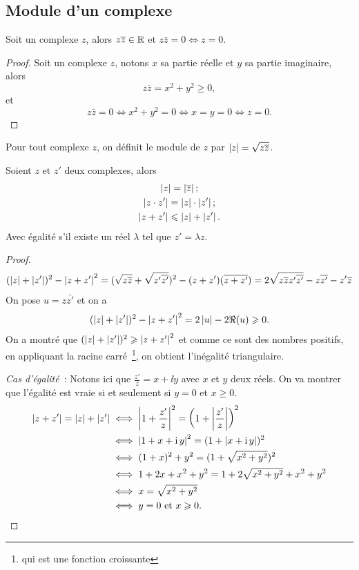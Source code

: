 \subsection{Module d'un complexe}
\label{subsec:modulecomplexe}
\begin{prop}
  Soit un complexe \(z\), alors \(z \overline{z} \in \mathbb{R}\) et \(z \bar{z}=0 \iff z = 0\).
\end{prop}
\begin{proof}
  Soit un complexe \(z\), notons \(x\) sa partie réelle et \(y\) sa partie imaginaire, alors
  \begin{equation}
    z \bar{z}=x^2+y^2 \geqslant 0,
  \end{equation}
  et
  \begin{equation}
    z \bar{z}=0 \iff x^2+y^2=0 \iff x=y=0 \iff z=0.
  \end{equation}
\end{proof}
%
\begin{defdef}
  Pour tout complexe \(z\), on définit le module de \(z\) par \(\left\lvert z\right\rvert=\sqrt{z \overline{z}}\).
\end{defdef}
%
\begin{prop}
  Soient \(z\) et \(z'\) deux complexes, alors
  \begin{gather}
    \left\lvert z\right\rvert=\left\lvert\overline{z}\right\rvert; \\
    \left\lvert z \cdot z'\right\rvert=\left\lvert z\right\rvert \cdot \left\lvert z'\right\rvert; \\
    \left\lvert z+z'\right\rvert\leqslant\left\lvert z\right\rvert+\left\lvert z'\right\rvert.
  \end{gather}
  Avec égalité s'il existe un réel \(\lambda\) tel que \(z'=\lambda z\).
\end{prop}
\begin{proof}
  \begin{equation}
    (\left\lvert z\right\rvert+\left\lvert z'\right\rvert)^2-\left\lvert z+z'\right\rvert^2
    =(\sqrt{z \overline{z}} +\sqrt{z' \overline{z'}})^2 - (z+z')(\overline{z+z'})
    =2 \sqrt{z \overline{z} z' \overline{z'}} - z \overline{z'} - z'\overline{z}
  \end{equation}
  On pose \(u=z \bar{z'}\) et on a
  \begin{equation}
    (\left\lvert z\right\rvert+\left\lvert z'\right\rvert)^2-\left\lvert z+z'\right\rvert^2=2 \left\lvert u\right\rvert-2 \Re(u) \geqslant 0.
  \end{equation}
  On a montré que \((\left\lvert z\right\rvert+\left\lvert z'\right\rvert)^2 \geqslant \left\lvert z+z'\right\rvert^2\) et comme ce sont des nombres positifs, en appliquant la racine carré~\footnote{qui est une fonction croissante}, on obtient l'inégalité triangulaire.

  \emph{Cas d'égalité}~: Notons ici que \(\frac{z'}{z}=x + \ii y\) avec \(x\) et \(y\) deux réels. On va montrer que l'égalité est vraie si et seulement si \(y=0\) et \(x \geqslant 0\).
  \begin{align}
    \left\lvert z+z'\right\rvert=\left\lvert z\right\rvert+\left\lvert z'\right\rvert &\iff \left\lvert1+\frac{z'}{z}\right\rvert^2=\left(1+\left\lvert\frac{z'}{z}\right\rvert\right)^2 \\
    &\iff \left\lvert1+x+\operatorname{i} y\right\rvert^2 = (1+ \left\lvert x+ \operatorname{i} y\right\rvert)^2 \\
    &\iff (1+x)^2+y^2 = (1+\sqrt{x^2+y^2})^2 \\
    &\iff 1+2x+x^2+y^2 = 1 + 2\sqrt{x^2+y^2} + x^2+y^2 \\
    &\iff x = \sqrt{x^2+y^2}\\
    &\iff y=0 \text{~et~} x \geqslant 0.
  \end{align}
\end{proof}
